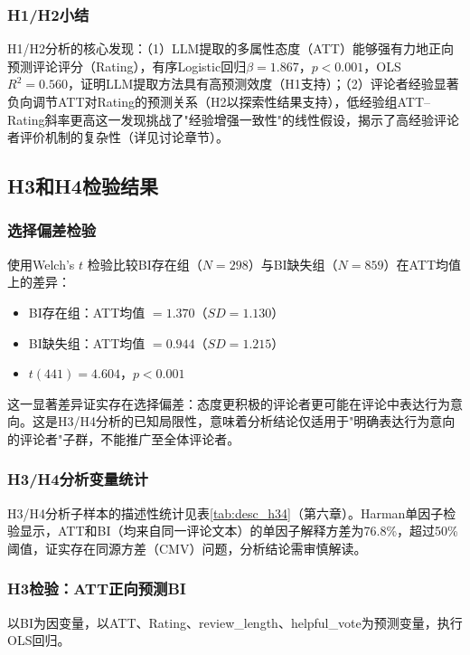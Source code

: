 \subsubsection{H1/H2小结}

H1/H2分析的核心发现：（1）LLM提取的多属性态度（ATT）能够强有力地正向预测评论评分（Rating），有序Logistic回归$\beta=1.867$，$p<0.001$，OLS $R^2=0.560$，证明LLM提取方法具有高预测效度（H1支持）；（2）评论者经验显著负向调节ATT对Rating的预测关系（H2以探索性结果支持），低经验组ATT--Rating斜率更高这一发现挑战了"经验增强一致性"的线性假设，揭示了高经验评论者评价机制的复杂性（详见讨论章节）。

\subsection{H3和H4检验结果}

\subsubsection{选择偏差检验}

使用Welch's $t$ 检验比较BI存在组（$N=298$）与BI缺失组（$N=859$）在ATT均值上的差异：
\begin{itemize}
  \item BI存在组：ATT均值 $= 1.370$（$SD=1.130$）
  \item BI缺失组：ATT均值 $= 0.944$（$SD=1.215$）
  \item $t(441) = 4.604$，$p<0.001$
\end{itemize}

这一显著差异证实存在选择偏差：态度更积极的评论者更可能在评论中表达行为意向。这是H3/H4分析的已知局限性，意味着分析结论仅适用于"明确表达行为意向的评论者"子群，不能推广至全体评论者。

\subsubsection{H3/H4分析变量统计}

H3/H4分析子样本的描述性统计见表\ref{tab:desc_h34}（第六章）。Harman单因子检验显示，ATT和BI（均来自同一评论文本）的单因子解释方差为76.8\%，超过50\%阈值，证实存在同源方差（CMV）问题，分析结论需审慎解读。

\subsubsection{H3检验：ATT正向预测BI}

以BI为因变量，以ATT、Rating、review\_length、helpful\_vote为预测变量，执行OLS回归。

